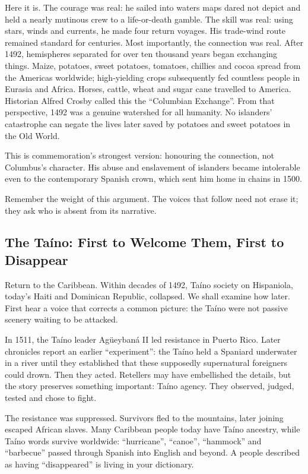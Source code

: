 Here it is. The courage was real: he sailed into waters maps dared not depict and held a nearly mutinous crew to a life-or-death gamble. The skill was real: using stars, winds and currents, he made four return voyages. His trade-wind route remained standard for centuries. Most importantly, the connection was real. After 1492, hemispheres separated for over ten thousand years began exchanging things. Maize, potatoes, sweet potatoes, tomatoes, chillies and cocoa spread from the Americas worldwide; high-yielding crops subsequently fed countless people in Eurasia and Africa. Horses, cattle, wheat and sugar cane travelled to America. Historian Alfred Crosby called this the ``Columbian Exchange''. From that perspective, 1492 was a genuine watershed for all humanity. No islanders' catastrophe can negate the lives later saved by potatoes and sweet potatoes in the Old World.

This is commemoration's strongest version: honouring the connection, not Columbus's character. His abuse and enslavement of islanders became intolerable even to the contemporary Spanish crown, which sent him home in chains in 1500.

Remember the weight of this argument. The voices that follow need not erase it; they ask who is absent from its narrative.

\subsection[The Taíno]{The Taíno: First to Welcome Them, First to Disappear}
Return to the Caribbean. Within decades of 1492, Taíno society on Hispaniola, today's Haiti and Dominican Republic, collapsed. We shall examine how later. First hear a voice that corrects a common picture: the Taíno were not passive scenery waiting to be attacked.

In 1511, the Taíno leader Agüeybaná II led resistance in Puerto Rico. Later chronicles report an earlier ``experiment'': the Taíno held a Spaniard underwater in a river until they established that these supposedly supernatural foreigners could drown. Then they acted. Retellers may have embellished the details, but the story preserves something important: Taíno agency. They observed, judged, tested and chose to fight.

The resistance was suppressed. Survivors fled to the mountains, later joining escaped African slaves. Many Caribbean people today have Taíno ancestry, while Taíno words survive worldwide: ``hurricane'', ``canoe'', ``hammock'' and ``barbecue'' passed through Spanish into English and beyond. A people described as having ``disappeared'' is living in your dictionary.

